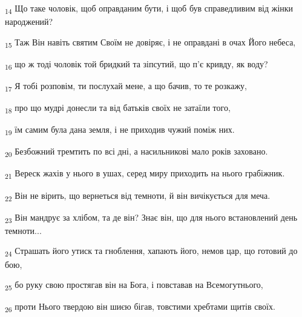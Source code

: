 \begin{tcolorbox}
\textsubscript{14} Що таке чоловік, щоб оправданим бути, і щоб був справедливим від жінки народжений?
\end{tcolorbox}
\begin{tcolorbox}
\textsubscript{15} Таж Він навіть святим Своїм не довіряє, і не оправдані в очах Його небеса,
\end{tcolorbox}
\begin{tcolorbox}
\textsubscript{16} що ж тоді чоловік той бридкий та зіпсутий, що п'є кривду, як воду?
\end{tcolorbox}
\begin{tcolorbox}
\textsubscript{17} Я тобі розповім, ти послухай мене, а що бачив, то те розкажу,
\end{tcolorbox}
\begin{tcolorbox}
\textsubscript{18} про що мудрі донесли та від батьків своїх не затаїли того,
\end{tcolorbox}
\begin{tcolorbox}
\textsubscript{19} їм самим була дана земля, і не приходив чужий поміж них.
\end{tcolorbox}
\begin{tcolorbox}
\textsubscript{20} Безбожний тремтить по всі дні, а насильникові мало років заховано.
\end{tcolorbox}
\begin{tcolorbox}
\textsubscript{21} Вереск жахів у нього в ушах, серед миру приходить на нього грабіжник.
\end{tcolorbox}
\begin{tcolorbox}
\textsubscript{22} Він не вірить, що вернеться від темноти, й він вичікується для меча.
\end{tcolorbox}
\begin{tcolorbox}
\textsubscript{23} Він мандрує за хлібом, та де він? Знає він, що для нього встановлений день темноти...
\end{tcolorbox}
\begin{tcolorbox}
\textsubscript{24} Страшать його утиск та гноблення, хапають його, немов цар, що готовий до бою,
\end{tcolorbox}
\begin{tcolorbox}
\textsubscript{25} бо руку свою простягав він на Бога, і повставав на Всемогутнього,
\end{tcolorbox}
\begin{tcolorbox}
\textsubscript{26} проти Нього твердою він шиєю бігав, товстими хребтами щитів своїх.
\end{tcolorbox}
